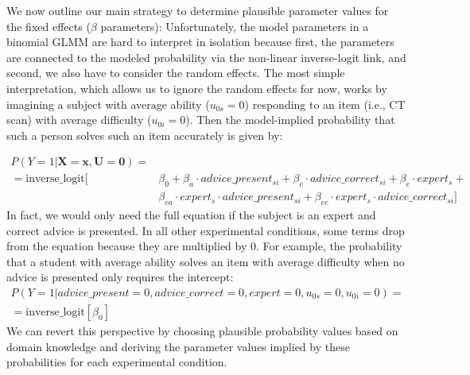 \documentclass[
  man,
  floatsintext,
  longtable,
  a4paper,
  nolmodern,
  notxfonts,
  notimes,
  colorlinks=true,linkcolor=blue,citecolor=blue,urlcolor=blue]{apa7}
\begin{document}
We now outline our main strategy to determine plausible parameter values
for the fixed effects (\(\beta\) parameters): Unfortunately, the model
parameters in a binomial GLMM are hard to interpret in isolation because
first, the parameters are connected to the modeled probability via the
non-linear inverse-logit link, and second, we also have to consider the
random effects. The most simple interpretation, which allows us to
ignore the random effects for now, works by imagining a subject with
average ability (\(u_{0s} = 0\)) responding to an item (i.e., CT scan)
with average difficulty (\(u_{0i} = 0\)). Then the model-implied
probability that such a person solves such an item accurately is given
by:

\[
\begin{aligned}
P(Y=1|\mathbf{X=x}, \mathbf{U} = \mathbf{0}) = \\
= \text{inverse\_logit}[&\beta_0 + \beta_a \cdot advice\_present_{si} + \beta_c \cdot advice\_correct_{si} + \beta_e \cdot expert_s + \\
&\beta_{ea} \cdot expert_{s} \cdot advice\_present_{si} + \beta_{ec} \cdot expert_{s} \cdot advice\_correct_{si}]
\end{aligned}
\] In fact, we would only need the full equation if the subject is an
expert and correct advice is presented. In all other experimental
conditions, some terms drop from the equation because they are
multiplied by \(0\). For example, the probability that a student with
average ability solves an item with average difficulty when no advice is
presented only requires the intercept: \[
\begin{aligned}
P(Y=1| advice\_present = 0, advice\_correct = 0, expert = 0, u_{0s} = 0, u_{0i} = 0) = \\
= \text{inverse\_logit}[\beta_0]
\end{aligned}
\] We can revert this perspective by choosing plausible probability
values based on domain knowledge and deriving the parameter values
implied by these probabilities for each experimental condition.

\newpage
\end{document}
